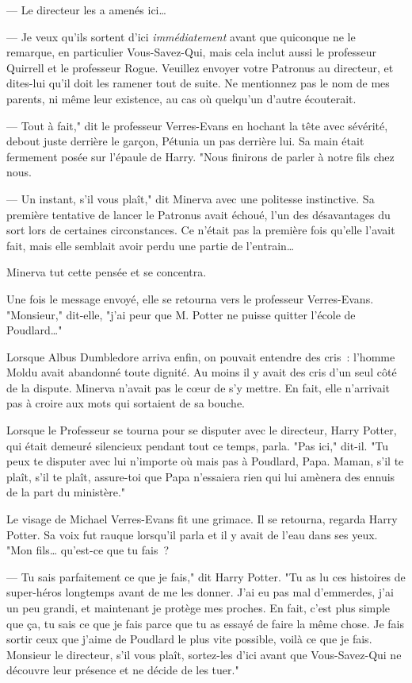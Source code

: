 --- Le directeur les a amenés ici…

--- Je veux qu'ils sortent d'ici \emph{immédiatement} avant que quiconque ne le remarque, en particulier Vous-Savez-Qui, mais cela inclut aussi le professeur Quirrell et le professeur Rogue. Veuillez envoyer votre Patronus au directeur, et dites-lui qu'il doit les ramener tout de suite. Ne mentionnez pas le nom de mes parents, ni même leur existence, au cas où quelqu'un d'autre écouterait.

--- Tout à fait," dit le professeur Verres-Evans en hochant la tête avec sévérité, debout juste derrière le garçon, Pétunia un pas derrière lui. Sa main était fermement posée sur l'épaule de Harry. "Nous finirons de parler à notre fils chez nous.

--- Un instant, s'il vous plaît," dit Minerva avec une politesse instinctive. Sa première tentative de lancer le Patronus avait échoué, l'un des désavantages du sort lors de certaines circonstances. Ce n'était pas la première fois qu'elle l'avait fait, mais elle semblait avoir perdu une partie de l'entrain…

Minerva tut cette pensée et se concentra.

Une fois le message envoyé, elle se retourna vers le professeur Verres-Evans. "Monsieur," dit-elle, "j'ai peur que M. Potter ne puisse quitter l'école de Poudlard…"

Lorsque Albus Dumbledore arriva enfin, on pouvait entendre des cris~: l'homme Moldu avait abandonné toute dignité. Au moins il y avait des cris d'un seul côté de la dispute. Minerva n'avait pas le cœur de s'y mettre. En fait, elle n'arrivait pas à croire aux mots qui sortaient de sa bouche.

Lorsque le Professeur se tourna pour se disputer avec le directeur, Harry Potter, qui était demeuré silencieux pendant tout ce temps, parla. "Pas ici," dit-il. "Tu peux te disputer avec lui n'importe où mais pas à Poudlard, Papa. Maman, s'il te plaît, s'il te plaît, assure-toi que Papa n'essaiera rien qui lui amènera des ennuis de la part du ministère."

Le visage de Michael Verres-Evans fit une grimace. Il se retourna, regarda Harry Potter. Sa voix fut rauque lorsqu'il parla et il y avait de l'eau dans ses yeux. "Mon fils… qu'est-ce que tu fais~?

--- Tu sais parfaitement ce que je fais," dit Harry Potter. "Tu as lu ces histoires de super-héros longtemps avant de me les donner. J'ai eu pas mal d'emmerdes, j'ai un peu grandi, et maintenant je protège mes proches. En fait, c'est plus simple que ça, tu sais ce que je fais parce que tu as essayé de faire la même chose. Je fais sortir ceux que j'aime de Poudlard le plus vite possible, voilà ce que je fais. Monsieur le directeur, s'il vous plaît, sortez-les d'ici avant que Vous-Savez-Qui ne découvre leur présence et ne décide de les tuer."

